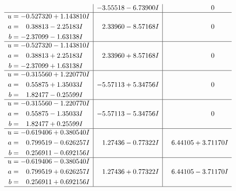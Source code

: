 \documentclass[1p]{elsarticle_modified}
\theoremstyle{definition}
\begin{document}
$$\begin{array}{c|c|c}
 & -3.55518 - 6.73900 I & \phantom{-0.000000 } 0 \\ \hline\begin{aligned}
u &= -0.527320 + 1.143810 I \\
a &= \phantom{-}0.38813 - 2.25183 I \\
b &= -2.37099 - 1.63138 I\end{aligned}
 & \phantom{-}2.33960 - 8.57168 I & \phantom{-0.000000 } 0 \\ \hline\begin{aligned}
u &= -0.527320 - 1.143810 I \\
a &= \phantom{-}0.38813 + 2.25183 I \\
b &= -2.37099 + 1.63138 I\end{aligned}
 & \phantom{-}2.33960 + 8.57168 I & \phantom{-0.000000 } 0 \\ \hline\begin{aligned}
u &= -0.315560 + 1.220770 I \\
a &= \phantom{-}0.55875 + 1.35033 I \\
b &= \phantom{-}1.82477 - 0.25599 I\end{aligned}
 & -5.57113 + 5.34756 I & \phantom{-0.000000 } 0 \\ \hline\begin{aligned}
u &= -0.315560 - 1.220770 I \\
a &= \phantom{-}0.55875 - 1.35033 I \\
b &= \phantom{-}1.82477 + 0.25599 I\end{aligned}
 & -5.57113 - 5.34756 I & \phantom{-0.000000 } 0 \\ \hline\begin{aligned}
u &= -0.619406 + 0.380540 I \\
a &= \phantom{-}0.799519 - 0.626257 I \\
b &= \phantom{-}0.256911 - 0.692156 I\end{aligned}
 & \phantom{-}1.27436 - 0.77322 I & \phantom{-}6.44105 + 3.71170 I \\ \hline\begin{aligned}
u &= -0.619406 - 0.380540 I \\
a &= \phantom{-}0.799519 + 0.626257 I \\
b &= \phantom{-}0.256911 + 0.692156 I\end{aligned}
 & \phantom{-}1.27436 + 0.77322 I & \phantom{-}6.44105 - 3.71170 I\\
 \hline 
 \end{array}$$\newpage$$\begin{array}{c|c|c}  

\end{array}$$
\end{document}
